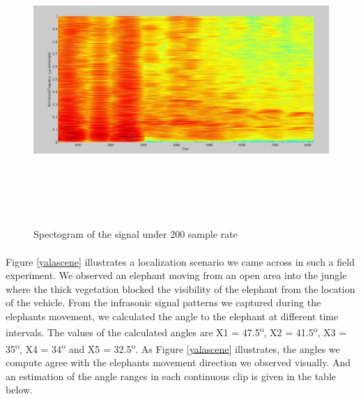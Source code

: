 \documentclass[12pt]{article}
\numberwithin{figure}{section}
\numberwithin{table}{section}
\begin{document}
\begin{figure}[H]
\centering
\includegraphics[width=14cm,height=11cm,keepaspectratio]{200.png}
\caption{Spectogram of the signal under 200 sample rate}
\label{d:200}
\end{figure}

\paragraph{}
Figure \ref{yalascene} illustrates a localization scenario we came across in such a field experiment. We observed an elephant moving from an open area into the jungle where the thick vegetation blocked the visibility of the elephant from
the location of the vehicle. From the infrasonic signal patterns we captured during the elephants movement, we calculated
the angle to the elephant at different time intervals. The values of the calculated angles are X1 = 47.5\textsuperscript{o}, X2 = 41.5\textsuperscript{o}, X3 = 35\textsuperscript{o}, X4 = 34\textsuperscript{o} and X5 = 32.5\textsuperscript{o}. As Figure \ref{yalascene} illustrates, the angles we compute agree with the elephants movement direction we observed visually.
And an estimation of the angle ranges in each continuous clip is given in the table below.
\end{document}
